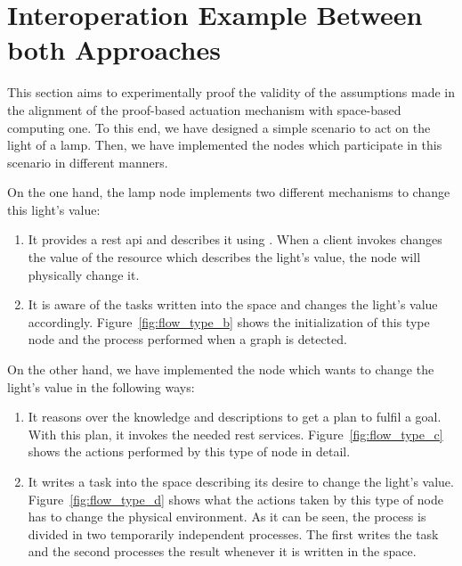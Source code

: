 \section{Interoperation Example Between both Approaches}

This section aims to experimentally proof the validity of the assumptions made in the alignment of the proof-based actuation mechanism with space-based computing one.
To this end, we have designed a simple scenario to act on the light of a lamp.
Then, we have implemented the nodes which participate in this scenario in different manners.


On the one hand, the lamp node implements two different mechanisms to change this light's value:
\begin{enumerate}[label=\itshape(\alph*\upshape)]
  \item It provides a \ac{rest} \ac{api} and describes it using \restdesc{}. %
        When a client invokes changes the value of the resource which describes the light's value, the node will physically change it.
  \item It is aware of the tasks written into the space and changes the light's value accordingly. %
	Figure~\ref{fig:flow_type_b} shows the initialization of this type node and the process performed when a graph is detected.
\end{enumerate}


On the other hand, we have implemented the node which wants to change the light's value in the following ways:
\begin{enumerate}[resume,label=\itshape(\alph*\upshape)]
  \item It reasons over the knowledge and descriptions to get a plan to fulfil a goal.
	With this plan, it invokes the needed \ac{rest} services.
	Figure~\ref{fig:flow_type_c} shows the actions performed by this type of node in detail.
  \item It writes a task into the space describing its desire to change the light's value.
	Figure~\ref{fig:flow_type_d} shows what the actions taken by this type of node has to change the physical environment.
	As it can be seen, the process is divided in two temporarily independent processes.
	The first writes the task and the second processes the result whenever it is written in the space.
\end{enumerate}


\newcommand{\prova}{\emph{(a)} provider}
\newcommand{\provb}{\emph{(b)} provider}
\newcommand{\consc}{\emph{(c)} consumer}
\newcommand{\consd}{\emph{(d)} consumer}
\newcommand{\typea}{\emph{Type (a)} node}
\newcommand{\typeb}{\emph{Type (b)} node}
\newcommand{\typec}{\emph{Type (c)} node}
\newcommand{\typed}{\emph{Type (d)} node}


